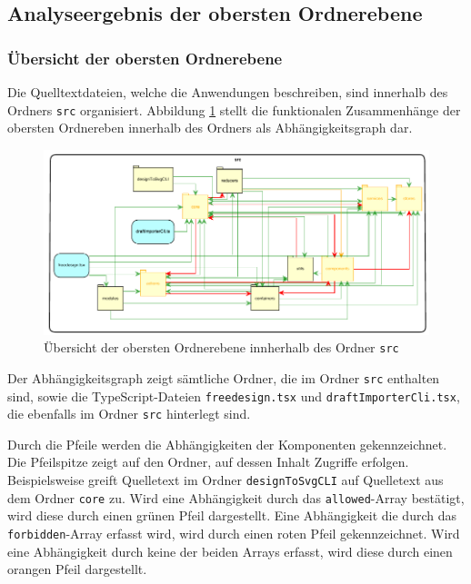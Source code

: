 \subsection{Analyseergebnis der obersten Ordnerebene}
\subsubsection{Übersicht der obersten Ordnerebene}
\label{sec:overview}
Die Quelltextdateien, welche die Anwendungen beschreiben, sind innerhalb des Ordners \lstinline|src| organisiert. 
Abbildung \ref{fig:obersteOrdnerebene} stellt die funktionalen Zusammenhänge der obersten Ordnereben innerhalb des Ordners als Abhängigkeitsgraph dar.  
\begin{figure}[H]
	\centering
    \caption{Übersicht der obersten Ordnerebene innherhalb des Ordner \lstinline|src|}
	\label{fig:obersteOrdnerebene}
	\includegraphics{diagrams/Ist-Architektur/Projektuebersicht.pdf}
\end{figure}


Der Abhängigkeitsgraph zeigt sämtliche Ordner, die im Ordner \lstinline|src| enthalten sind, sowie die TypeScript-Dateien \lstinline|freedesign.tsx| und \lstinline|draftImporterCli.tsx|, die ebenfalls im Ordner \lstinline|src| hinterlegt sind.  

Durch die Pfeile werden die Abhängigkeiten der Komponenten gekennzeichnet. Die Pfeilspitze zeigt auf den Ordner, auf dessen Inhalt Zugriffe erfolgen. Beispielsweise greift Quelletext im Ordner \lstinline|designToSvgCLI| auf Quelletext aus dem Ordner \lstinline|core| zu.
Wird eine Abhängigkeit durch das \lstinline|allowed|-Array bestätigt, wird diese durch einen grünen Pfeil dargestellt. Eine Abhängigkeit die durch das \lstinline|forbidden|-Array erfasst wird, wird durch einen roten Pfeil gekennzeichnet. Wird eine Abhängigkeit durch keine der beiden Arrays erfasst, wird diese durch einen orangen Pfeil dargestellt.

